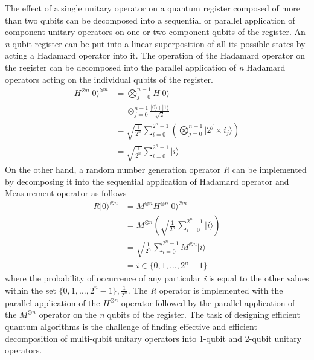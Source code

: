 The effect of a single unitary operator on a quantum register composed of more than two qubits can be decomposed into a sequential or parallel application of component unitary operators on one or two component qubits of the register. An \textit{n}-qubit register can be put into a linear superposition of all its possible states by acting a Hadamard operator into it. The operation of the Hadamard operator on the register can be decomposed into the parallel application of \textit{n} Hadamard operators acting on the individual qubits of the register.
\begin{align*}
H^{\otimes n} \vert 0 \rangle^{\otimes n} &= \bigotimes_{j=0}^{n - 1} H\vert 0 \rangle\\
&= \otimes_{j=0}^{n-1} \frac{\vert 0 \rangle + \vert 1 \rangle}{\sqrt{2}}\\
&= \sqrt{\frac{1}{2^{n}}} \sum_{i=0}^{2^{n}-1} \left( \bigotimes_{j=0}^{n-1} \vert 2^{j} \times i_{j} \rangle \right)\\
&= \sqrt{\frac{1}{2^{n}}} \sum_{i=0}^{2^{n}-1} \vert i \rangle
\end{align*}
On the other hand, a random number generation operator \textit{R} can be implemented by decomposing it into the sequential application of Hadamard operator and Measurement operator as follows
\begin{align*}
R \vert 0 \rangle^{\otimes n} &= M^{\otimes n}H^{\otimes n} \vert 0 \rangle^{\otimes n}\\
&= M^{\otimes n} \left( \sqrt{\frac{1}{2^{n}}} \sum_{i=0}^{2^{n}-1} \vert i \rangle \right)\\
&= \sqrt{\frac{1}{2^{n}}} \sum_{i=0}^{2^{n}-1}M^{\otimes n}  \vert i \rangle\\
&= i \in \{0, 1, \ldots, 2^{n} - 1 \}
\end{align*}
where the probability of occurrence of any particular \textit{i} is equal to the other values within the set $\{0,1,\ldots,2^{n}-1\}, \frac{1}{2^{n}}$. The \textit{R} operator is implemented with the parallel application of the $H^{\otimes n}$ operator followed by the parallel application of the $M^{\otimes n}$ operator on the \textit{n} qubits of the register. The task of designing efficient quantum algorithms is the challenge of finding effective and efficient decomposition of multi-qubit unitary operators into 1-qubit and 2-qubit unitary operators.

